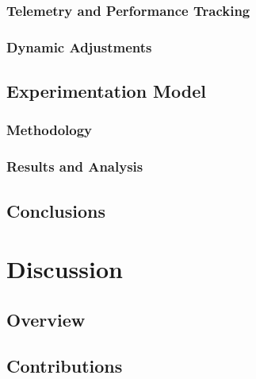 \documentclass[cic,tc,english]{iiufrgs}
\begin{document}
\subsection{Telemetry and Performance Tracking}

\subsection{Dynamic Adjustments}

\section{Experimentation Model}

\subsection{Methodology}

\subsection{Results and Analysis}

\section{Conclusions}




\chapter{Discussion}

\section{Overview}

\section{Contributions}
\end{document}

